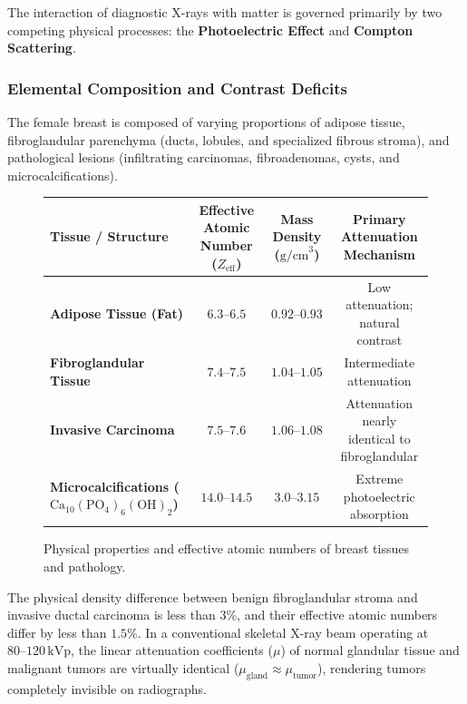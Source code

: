 \documentclass[11pt,a4paper]{article}
\begin{document}
The interaction of diagnostic X-rays with matter is governed primarily by two competing physical processes: the \textbf{Photoelectric Effect} and \textbf{Compton Scattering}.

\subsubsection{Elemental Composition and Contrast Deficits}
The female breast is composed of varying proportions of adipose tissue, fibroglandular parenchyma (ducts, lobules, and specialized fibrous stroma), and pathological lesions (infiltrating carcinomas, fibroadenomas, cysts, and microcalcifications).

\begin{figure}[htbp]
\centering
\setlength{\tabcolsep}{4pt}
\begin{tabular}{lccc}
\toprule
\textbf{Tissue / Structure} & \textbf{Effective Atomic Number ($Z_{\text{eff}}$)} & \textbf{Mass Density ($\text{g/cm}^3$)} & \textbf{Primary Attenuation Mechanism} \\
\midrule
\textbf{Adipose Tissue (Fat)} & $6.3\text{--}6.5$ & $0.92\text{--}0.93$ & Low attenuation; natural contrast \\
\textbf{Fibroglandular Tissue} & $7.4\text{--}7.5$ & $1.04\text{--}1.05$ & Intermediate attenuation \\
\textbf{Invasive Carcinoma} & $7.5\text{--}7.6$ & $1.06\text{--}1.08$ & Attenuation nearly identical to fibroglandular \\
\textbf{Microcalcifications ($\text{Ca}_{10}(\text{PO}_4)_6(\text{OH})_2$)} & $14.0\text{--}14.5$ & $3.0\text{--}3.15$ & Extreme photoelectric absorption \\
\bottomrule
\end{tabular}
\caption{Physical properties and effective atomic numbers of breast tissues and pathology.}
\label{tab:breast_physics}
\end{figure}

The physical density difference between benign fibroglandular stroma and invasive ductal carcinoma is less than $3\%$, and their effective atomic numbers differ by less than $1.5\%$. In a conventional skeletal X-ray beam operating at $80\text{--}120\,\text{kVp}$, the linear attenuation coefficients ($\mu$) of normal glandular tissue and malignant tumors are virtually identical ($\mu_{\text{gland}} \approx \mu_{\text{tumor}}$), rendering tumors completely invisible on radiographs.
\end{document}

